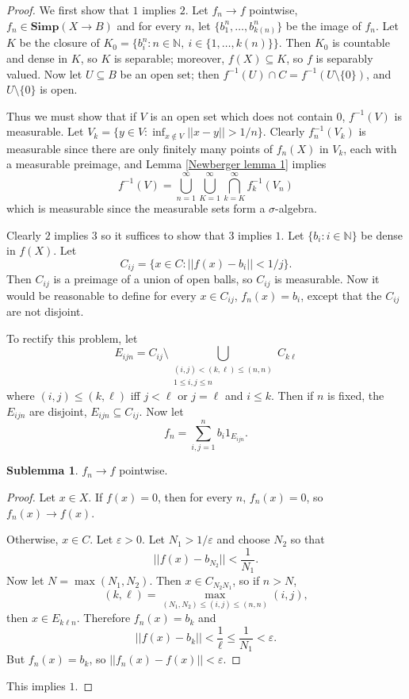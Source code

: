 \documentclass[12pt]{book}
\newcommand{\NN}{\mathbb{N}}
\newcommand{\Simp}{\mathbf{Simp}}
\theoremstyle{definition}
\newtheorem{sublemma}[theorem]{Sublemma}
\begin{document}
\begin{proof}
We first show that $1$ implies $2$.
Let $f_n \to f$ pointwise, $f_n \in \Simp(X \to B)$ and for every $n$, let $\{b_1^n, \dots, b_{k(n)}^n\}$ be the image of $f_n$.
Let $K$ be the closure of $K_0 = \{b_i^n: n \in \NN,~i \in \{1, \dots, k(n)\}\}$.
Then $K_0$ is countable and dense in $K$, so $K$ is separable; moreover, $f(X) \subseteq K$, so $f$ is separably valued.
Now let $U \subseteq B$ be an open set; then $f^{-1}(U) \cap C = f^{-1}(U \setminus \{0\})$, and $U \setminus \{0\}$ is open.

Thus we must show that if $V$ is an open set which does not contain $0$, $f^{-1}(V)$ is measurable. Let $V_k = \{y \in V: \inf_{x \notin V} ||x - y|| > 1/n\}$. Clearly $f_n^{-1}(V_k)$ is measurable since there are only finitely many points of $f_n(X)$ in $V_k$, each with a measurable preimage, and Lemma \ref{Newberger lemma 1} implies
$$f^{-1}(V) = \bigcup_{n=1}^\infty \bigcup_{K=1}^\infty \bigcap_{k=K}^\infty f_k^{-1}(V_n)$$
which is measurable since the measurable sets form a $\sigma$-algebra.

Clearly $2$ implies $3$ so it suffices to show that $3$ implies $1$.
Let $\{b_i: i \in \NN\}$ be dense in $f(X)$.
Let
$$C_{ij} = \{x \in C: ||f(x) - b_i|| < 1/j\}.$$
Then $C_{ij}$ is a preimage of a union of open balls, so $C_{ij}$ is measurable.
Now it would be reasonable to define for every $x \in C_{ij}$, $f_n(x) = b_i$, except that the $C_{ij}$ are not disjoint.

To rectify this problem, let
$$E_{ijn} = C_{ij} \setminus \bigcup_{\substack{(i,j) < (k, \ell) \leq (n, n)\\1 \leq i,j \leq n}} C_{k\ell}$$
where $(i, j) \leq (k, \ell)$ iff $j < \ell$ or $j = \ell$ and $i \leq k$.
Then if $n$ is fixed, the $E_{ijn}$ are disjoint, $E_{ijn} \subseteq C_{ij}$.
Now let
$$f_n = \sum_{i,j=1}^n b_i 1_{E_{ijn}}.$$
\begin{sublemma}
$f_n \to f$ pointwise.
\end{sublemma}
\begin{proof}
Let $x \in X$. If $f(x) = 0$, then for every $n$, $f_n(x) = 0$, so $f_n(x) \to f(x)$.

Otherwise, $x \in C$. Let $\varepsilon > 0$. Let $N_1 > 1/\varepsilon$ and choose $N_2$ so that
$$||f(x) - b_{N_2}|| < \frac{1}{N_1}.$$
Now let $N = \max(N_1, N_2)$. Then $x \in C_{N_2N_1}$, so if $n > N$,
$$(k, \ell) = \max_{(N_1, N_2) \leq (i, j) \leq (n, n)} (i,j),$$
then $x \in E_{k\ell n}$. Therefore $f_n(x) = b_k$ and
$$||f(x) - b_k|| < \frac{1}{\ell} \leq \frac{1}{N_1} < \varepsilon.$$
But $f_n(x) = b_k$, so $||f_n(x) - f(x)|| < \varepsilon$.
\end{proof}
This implies $1$.
\end{proof}
\end{document}
